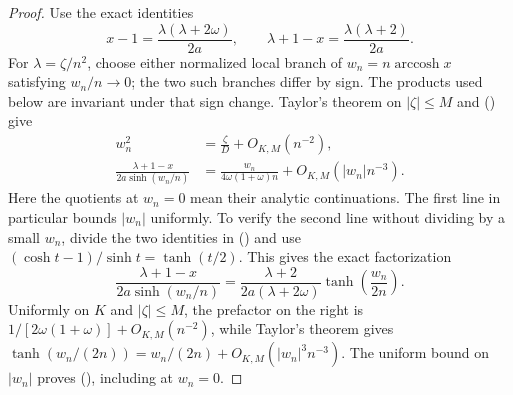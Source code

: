 \documentclass[twoside,10pt]{article}
\numberwithin{equation}{section}
\theoremstyle{slbody}
\theoremstyle{definition}
\theoremstyle{remark}
\renewcommand{\eqref}[1]{%
  \textup{{\normalfont(\oldstylenums{\ref{#1}}}\normalfont)}}
\begin{document}
\begin{proof}
Use the exact identities
\begin{equation}\label{eq:fixed-exact-x-identities}
 x-1=\frac{\lambda(\lambda+2\omega)}{2a},
 \qquad
 \lambda+1-x=\frac{\lambda(\lambda+2)}{2a}.
\end{equation}
For $\lambda=\zeta/n^2$, choose either normalized local branch of
$w_n=n\operatorname{arccosh}x$ satisfying $w_n/n\to0$; the two such
branches differ by sign.  The products used below are invariant under
that sign change.  Taylor's theorem on $|\zeta|\le M$ and
\eqref{eq:fixed-exact-x-identities} give
\begin{align}
 w_n^2&=\frac{\zeta}{D}+O_{K,M}(n^{-2}),\label{eq:fixed-threshold-w}\\
 \frac{\lambda+1-x}{2a\sinh(w_n/n)}
  &=\frac{w_n}{4\omega(1+\omega)n}
    +O_{K,M}(|w_n|n^{-3}).
  \label{eq:fixed-threshold-coefficient}
\end{align}
Here the quotients at $w_n=0$ mean their analytic continuations.  The
first line in particular bounds $|w_n|$ uniformly.  To verify the
second line without dividing by a small $w_n$, divide the two identities
in \eqref{eq:fixed-exact-x-identities} and use
$(\cosh t-1)/\sinh t=\tanh(t/2)$.  This gives the exact factorization
\[
 \frac{\lambda+1-x}{2a\sinh(w_n/n)}
 =\frac{\lambda+2}{2a(\lambda+2\omega)}
   \tanh\!\left(\frac{w_n}{2n}\right).
\]
Uniformly on $K$ and $|\zeta|\le M$, the prefactor on the right is
$1/[2\omega(1+\omega)]+O_{K,M}(n^{-2})$, while Taylor's theorem gives
$\tanh(w_n/(2n))=w_n/(2n)+O_{K,M}(|w_n|^3n^{-3})$.
The uniform bound on $|w_n|$ proves
\eqref{eq:fixed-threshold-coefficient}, including at $w_n=0$.


\end{proof}
\end{document}
